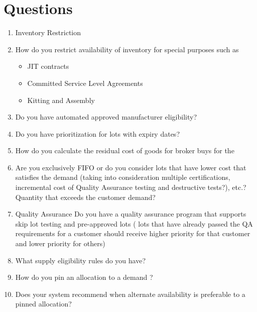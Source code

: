 \documentclass[letterpaper,10pt,english]{sphinxmanual}
\begin{document}
\section{Questions}
\label{FutureState:questions}\begin{enumerate}
\item {} 
Inventory Restriction

\item {} 
How do you restrict availability of inventory for special purposes
such as
\begin{itemize}
\item {} 
JIT contracts

\item {} 
Committed Service Level Agreements

\item {} 
Kitting and Assembly

\end{itemize}

\item {} 
Do you have automated approved manufacturer eligibility?

\item {} 
Do you have prioritization for lots with expiry dates?

\item {} 
How do you calculate the residual cost of goods for broker buys for
the

\item {} 
Are you exclusively FIFO or do you consider lots that have lower cost
that satisfies the demand (taking into consideration multiple
certifications, incremental cost of Quality Assurance testing and
destructive tests?), etc.? Quantity that exceeds the customer demand?

\item {} 
Quality Assurance Do you have a quality assurance program that
supports skip lot testing and pre-approved lots ( lots that have
already passed the QA requirements for a customer should receive
higher priority for that customer and lower priority for others)

\item {} 
What supply eligibility rules do you have?

\item {} 
How do you pin an allocation to a demand ?

\item {} 
Does your system recommend when alternate availability is preferable
to a pinned allocation?

\end{enumerate}
\end{document}
